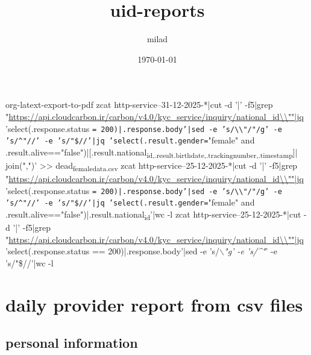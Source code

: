 \documentclass[11pt]{article}
\author{milad}
\date{\today}
\title{uid-reports}
\begin{document}
\maketitle
\tableofcontents

org-latext-export-to-pdf
zcat http-service--31-12-2025-*|cut -d '|' -f5|grep "\url{https://api.cloudcarbon.ir/carbon/v4.0/kyc\_service/inquiry/national\_id\\""|jq} 'select(.response.status \texttt{= 200)|.response.body'|sed -e 's/\textbackslash{}\textbackslash{}"/"/g' -e 's/\textasciicircum{}"//' -e 's/"\$//'|jq 'select(.result.gender=}"female" and .result.alive=="false")|[.result.national\textsubscript{id,.result.birth}\textsubscript{date,.tracking}\textsubscript{number,.timestamp}]| join(",")' >> dead\textsubscript{female}\textsubscript{data.csv}
zcat http-service--25-12-2025-*|cut -d '|' -f5|grep "\url{https://api.cloudcarbon.ir/carbon/v4.0/kyc\_service/inquiry/national\_id\\""|jq} 'select(.response.status \texttt{= 200)|.response.body'|sed -e 's/\textbackslash{}\textbackslash{}"/"/g' -e 's/\textasciicircum{}"//' -e 's/"\$//'|jq 'select(.result.gender=}"female" and .result.alive=="false")|.result.national\textsubscript{id}'|wc -l
zcat http-service--25-12-2025-*|cut -d '|' -f5|grep "\url{https://api.cloudcarbon.ir/carbon/v4.0/kyc\_service/inquiry/national\_id\\""|jq} 'select(.response.status == 200)|.response.body'|sed -e 's/$\backslash$\"\emph{"\emph{g' -e 's/\^{}"}}' -e 's/"\$//'|wc -l
\section{daily provider report from csv files}
\label{sec:orgfc92c02}
\subsection{personal information}
\label{sec:orgb9f758b}
\end{document}
